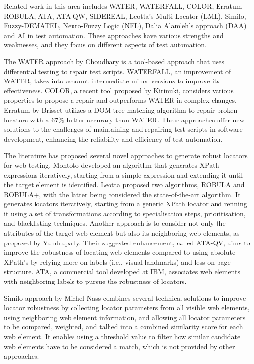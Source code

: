 \documentclass{article}
\begin{document}
Related work in this area includes WATER\cite{water}, WATERFALL\cite{waterfall}, COLOR\cite{color}, Erratum\cite{erratum} ROBULA\cite{robula}, ATA, ATA-QW\cite{ata}, SIDEREAL\cite{sidereal}, Leotta's Multi-Locator (LML)\cite{lml}, Similo\cite{similo}, Fuzzy-DEMATEL, Neuro-Fuzzy Logic (NFL), Dalia Alamleh's approach (DAA)\cite{fuzzy_ai_in_web_testing} and AI in test automation\cite{ai_in_test_auto}. These approaches have various strengths and weaknesses, and they focus on different aspects of test automation.

The WATER approach by Choudhary\cite{water} is a tool-based approach that uses differential testing to repair test scripts. WATERFALL\cite{waterfall}, an improvement of WATER\cite{water}, takes into account intermediate minor versions to improve its effectiveness. COLOR, a recent tool proposed by Kirinuki\cite{color}, considers various properties to propose a repair and outperforms WATER\cite{water} in complex changes. Erratum by Brisset\cite{erratum} utilizes a DOM tree matching algorithm to repair broken locators with a 67\% better accuracy than WATER\cite{water}. These approaches offer new solutions to the challenges of maintaining and repairing test scripts in software development, enhancing the reliability and efficiency of test automation.

The literature has proposed several novel approaches to generate robust locators for web testing\cite{robust_locators, robula+}. Montoto\cite{montoto} developed an algorithm that generates XPath expressions iteratively, starting from a simple expression and extending it until the target element is identified. Leotta proposed two algorithms, ROBULA\cite{robula} and ROBULA+\cite{robula+}, with the latter being considered the state-of-the-art algorithm. It generates locators iteratively, starting from a generic XPath locator and refining it using a set of transformations according to specialisation steps, prioritisation, and blacklisting techniques. Another approach is to consider not only the attributes of the target web element but also its neighboring web elements, as proposed by Yandrapally\cite{yandrapally}. Their suggested enhancement, called ATA-QV\cite{ata}, aims to improve the robustness of locating web elements compared to using absolute XPath's by relying more on labels (i.e., visual landmarks) and less on page structure. ATA\cite{ata}, a commercial tool developed at IBM, associates web elements with neighboring labels to pursue the robustness of locators.

Similo approach by Michel Nass\cite{similo} combines several technical solutions to improve locator robustness by collecting locator parameters from all visible web elements, using neighboring web element information, and allowing all locator parameters to be compared, weighted, and tallied into a combined similarity score for each web element. It enables using a threshold value to filter how similar candidate web elements have to be considered a match, which is not provided by other approaches.
\end{document}
